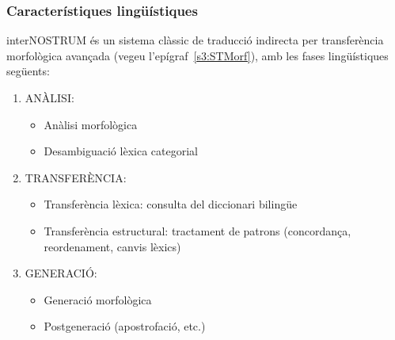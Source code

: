 \subsubsection{Característiques lingüístiques}

{\sf interNOSTRUM} és un sistema clàssic de traducció indirecta per
transferència morfològica avançada (vegeu l'epígraf~\ref{s3:STMorf}),
amb les fases lingüístiques següents:
\begin{enumerate}
\item ANÀLISI: \begin{itemize}
      \item Anàlisi morfològica
      \item Desambiguació lèxica categorial
      \end{itemize}
\item TRANSFERÈNCIA:\begin{itemize}
      \item Transferència lèxica: consulta del diccionari bilingüe
      \item Transferència estructural: tractament de patrons
        (concordança, reordenament, canvis lèxics)\end{itemize}
\item GENERACIÓ:\begin{itemize}
                \item Generació morfològica
                \item Postgeneració (apostrofació, etc.)
                \end{itemize}
\end{enumerate}

